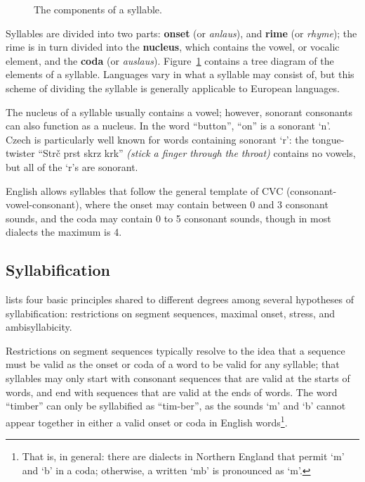 \documentclass{article}[11pt]
\begin{document}
\begin{figure}[!h]
\caption{The components of a syllable.}
\label{fig:syll}
\centering
{}
\end{figure}

Syllables are divided into two parts: \textbf{onset} (or \textit{anlaus}), and \textbf{rime} (or \textit{rhyme}); the rime is in turn divided into the \textbf{nucleus}, which contains the vowel, or vocalic element, and the \textbf{coda} (or \textit{auslaus}). Figure~\ref{fig:syll} contains a tree diagram of the elements of a syllable. Languages vary in what a syllable may consist of, but this scheme of dividing the syllable is generally applicable to European languages.

The nucleus of a syllable usually contains a vowel; however, sonorant consonants can also function as a nucleus. In the word ``button'', ``on'' is a sonorant `n'. Czech is particularly well known for words containing sonorant `r': the tongue-twister ``Str\v{c} prst skrz krk'' \textit{(stick a finger through the throat)} contains no vowels, but all of the `r's are sonorant.

English allows syllables that follow the general template of CVC (consonant-vowel-consonant), where the onset may contain between 0 and 3 consonant sounds, and the coda may contain 0 to 5 consonant sounds, though in most dialects the maximum is 4.

\subsection{Syllabification}
\label{ssect:syllabification}

\citet{fallows_experimental_1981} lists four basic principles shared to different degrees among several hypotheses of syllabification: restrictions on segment sequences, maximal onset, stress, and ambisyllabicity.

Restrictions on segment sequences typically resolve to the idea that a sequence must be valid as the onset or coda of a word to be valid for any syllable; that syllables may only start with consonant sequences that are valid at the starts of words, and end with sequences that are valid at the ends of words. The word ``timber'' can only be syllabified as ``tim-ber'', as the sounds `m' and `b' cannot appear together in either a valid onset or coda in English words\footnote{That is, in general: there are dialects in Northern England that permit `m' and `b' in a coda; otherwise, a written `mb' is pronounced as `m'.}.
\end{document}
